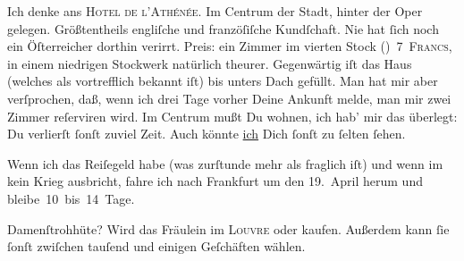 \pstart
           Ich denke ans \textsc{Hotel de l’Athénée}. Im Centrum der Stadt,
               hinter der Oper gelegen.
               Größtentheils engliſche und franzöſiſche Kundſchaft. Nie hat{ }ſich noch ein {\pb}Öſterreicher dorthin verirrt. Preis: ein Zimmer
               im vierten Stock (\label{K_L02807-2v}\label{K_L02807-2}) 7 \textsc{Francs}, in einem niedrigen Stockwerk natürlich theurer.
               Gegenwärtig iſt das Haus
               (welches als vortrefflich bekannt iſt) bis unters Dach gefüllt. Man hat mir aber
               verſprochen, daß, wenn ich drei Tage vorher Deine Ankunft melde, man mir zwei Zimmer
               reſerviren wird. Im Centrum
               mußt Du wohnen, ich hab’ mir das überlegt: Du verlierſt{ }ſonſt zuviel Zeit. Auch
               könnte \uline{ich} Dich{ }ſonſt zu{ }ſelten{ }ſehen.\pend
           
\pstart
           {\pb}Wenn ich das Reiſegeld habe (was zurſtunde mehr als
               fraglich iſt) und wenn im \label{K_L02807-3v}\label{K_L02807-3} kein Krieg ausbricht, fahre ich nach Frankfurt um den 19. April herum und
               bleibe 10 bis 14 Tage.\pend
           
\pstart
           Damenſtrohhüte? Wird  das Fräulein im \textsc{Louvre} oder \label{K_L02807-4v}\label{K_L02807-4} kaufen.  Außerdem kann{ }ſie{ }ſonſt zwiſchen
               tauſend und einigen Geſchäften wählen.\pend
           
